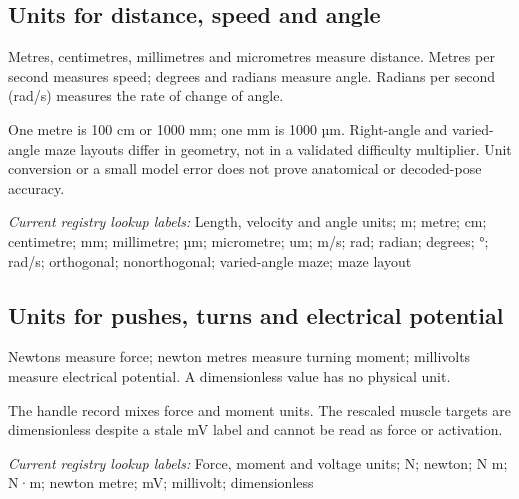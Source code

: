 \begin{samepage}
\subsection*{Units for distance, speed and angle}
\noindent Metres, centimetres, millimetres and micrometres measure distance. Metres per second measures speed; degrees and radians measure angle. Radians per second (rad/s) measures the rate of change of angle.\par
\end{samepage}
\begin{samepage}
\noindent One metre is 100 cm or 1000 mm; one mm is 1000 µm. Right-angle and varied-angle maze layouts differ in geometry, not in a validated difficulty multiplier. Unit conversion or a small model error does not prove anatomical or decoded-pose accuracy.\par\nopagebreak[4]

\end{samepage}


\noindent\textit{Current registry lookup labels:} Length, velocity and angle units; m; metre; cm; centimetre; mm; millimetre; µm; micrometre; um; m/s; rad; radian; degrees; °; rad/s; orthogonal; nonorthogonal; varied-angle maze; maze layout\par

\begin{samepage}
\subsection*{Units for pushes, turns and electrical potential}
\noindent Newtons measure force; newton metres measure turning moment; millivolts measure electrical potential. A dimensionless value has no physical unit.\par
\end{samepage}
\begin{samepage}
\noindent The handle record mixes force and moment units. The rescaled muscle targets are dimensionless despite a stale mV label and cannot be read as force or activation.\par
\end{samepage}


\noindent\textit{Current registry lookup labels:} Force, moment and voltage units; N; newton; N m; N·m; newton metre; mV; millivolt; dimensionless\par

